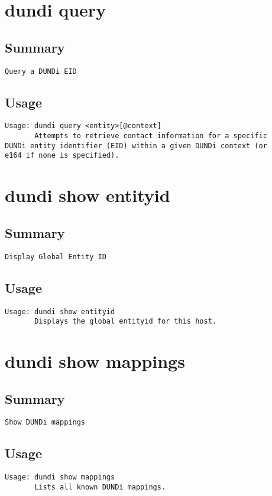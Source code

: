 \section{dundi query}
\subsection{Summary}
\begin{verbatim}
Query a DUNDi EID
\end{verbatim}
\subsection{Usage}
\begin{verbatim}
Usage: dundi query <entity>[@context]
       Attempts to retrieve contact information for a specific
DUNDi entity identifier (EID) within a given DUNDi context (or
e164 if none is specified).

\end{verbatim}


\section{dundi show entityid}
\subsection{Summary}
\begin{verbatim}
Display Global Entity ID
\end{verbatim}
\subsection{Usage}
\begin{verbatim}
Usage: dundi show entityid
       Displays the global entityid for this host.

\end{verbatim}


\section{dundi show mappings}
\subsection{Summary}
\begin{verbatim}
Show DUNDi mappings
\end{verbatim}
\subsection{Usage}
\begin{verbatim}
Usage: dundi show mappings
       Lists all known DUNDi mappings.

\end{verbatim}


